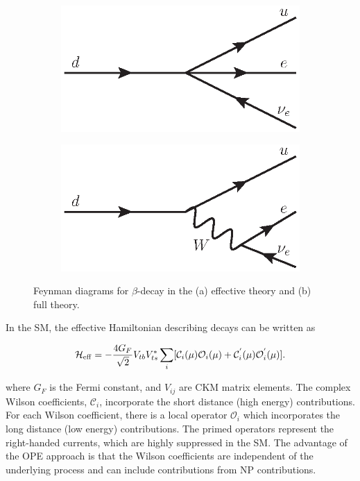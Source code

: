 \begin{figure}[!tb]
\centering
\begin{subfigure}{0.49\textwidth}
\includegraphics[width=\linewidth]{figs/theory/beta_4point.eps}
\caption{}
\label{fig:beta:a}
\end{subfigure}
\begin{subfigure}{0.49\textwidth}
\includegraphics[width=\linewidth]{figs/theory/beta_w.eps}
\caption{} 
\label{fig:beta:b}
\end{subfigure}
\caption{Feynman diagrams for $\beta$-decay in the (a) effective theory and (b) full theory.}
\label{fig:beta}
\end{figure}

In the SM, the effective Hamiltonian describing \btosll decays can be written as

\begin{equation}
\mathcal{H}_{\rm eff} = - \frac{4G_{F}}{\sqrt{2}}V_{tb}V^{*}_{ts}\sum_{i}[\mathcal{C}_{i}(\mu)\mathcal{O}_{i}(\mu) + \mathcal{C}^{'}_{i}(\mu)\mathcal{O}^{'}_{i}(\mu)].
\end{equation}

\noindent where $G_{F}$ is the Fermi constant, and $V_{ij}$ are CKM matrix elements. The complex Wilson coefficients, $\mathcal{C}_{i}$, incorporate the short distance (high energy) contributions. For each Wilson coefficient, there is a local operator $\mathcal{O}_{i}$ which incorporates the long distance (low energy) contributions. The primed operators represent the right-handed currents, which are highly suppressed in the SM. The advantage of the OPE approach is that the Wilson coefficients are independent of the underlying process and can include contributions from NP contributions. 

